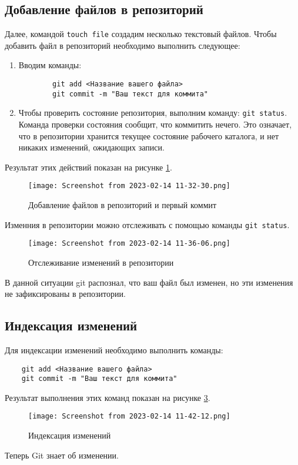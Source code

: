 \subsection{Добавление файлов в репозиторий}
Далее, командой \texttt{touch file} создадим несколько текстовый файлов.
Чтобы добавить файл в репозиторий необходимо выполнить следующее:
\begin{enumerate}
	\item Вводим команды:
	\begin{verbatim}
		git add <Название вашего файла>
		git commit -m "Ваш текст для коммита"
	\end{verbatim}
\item Чтобы проверить состояние репозитория,
	выполним команду: \texttt{git~status}.
	Команда проверки состояния сообщит, что коммитить нечего.
	Это означает, что в репозитории хранится текущее состояние
	рабочего каталога, и нет никаких изменений, ожидающих записи.
\end{enumerate}
Результат этих действий показан на рисунке \ref{fig:git:first_commit}.
\begin{figure}[hp]
	\centering
	\texttt{[image: Screenshot from 2023-02-14 11-32-30.png]}
	\caption{Добавление файлов в репозиторий и первый коммит}
	\label{fig:git:first_commit}
\end{figure}
Изменния в репозитории можно отслеживать с помощью команды \texttt{git status}.
\begin{figure}[hp]
	\centering
	\texttt{[image: Screenshot from 2023-02-14 11-36-06.png]}
	\caption{Отслеживание изменений в репозитории}
	\label{fig:git:status}
\end{figure}
В данной ситуации git распознал, что ваш файл был изменен, но эти изменения не
зафиксированы в репозитории.

\subsection{Индексация изменений}
Для индексации изменений необходимо выполнить команды:

\begin{verbatim}
	git add <Название вашего файла>
	git commit -m "Ваш текст для коммита"
\end{verbatim}

Результат выполнения этих команд показан на рисунке \ref{fig:git:second_commit}.

\begin{figure}[hp]
	\centering
	\texttt{[image: Screenshot from 2023-02-14 11-42-12.png]}
	\caption{Индексация изменений}
	\label{fig:git:second_commit}
\end{figure}
Теперь Git знает об изменении.

